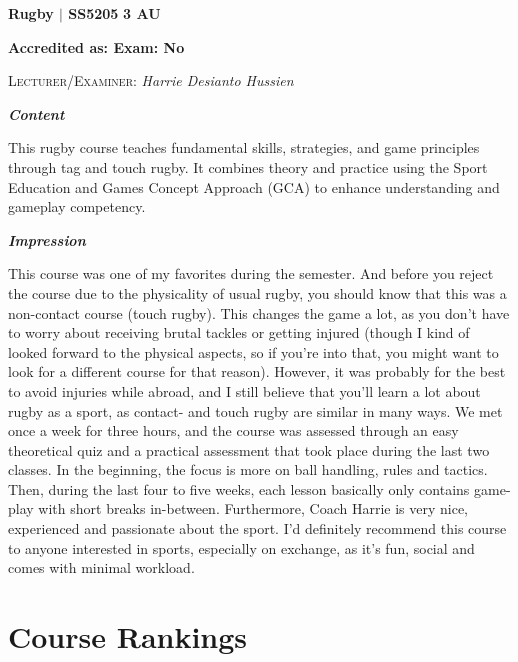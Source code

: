 \hrulefill

{\large{\textbf{Rugby $\vert$ SS5205} \hfill \textbf{3 AU}}}
\vspace{-0.3cm}

\textbf{Accredited as: \hfill Exam: No}

{\large{\textsc{Lecturer/Examiner:} \textit{Harrie Desianto Hussien}}} \vspace{0.4cm}

{\large{\textbf{\textit{Content}}}} 
\vspace{-0.25cm}

This rugby course teaches fundamental skills, strategies, and game principles through tag and touch rugby. It combines theory and practice using the Sport Education and Games Concept Approach (GCA) to enhance understanding and gameplay competency.

{\large{\textbf{\textit{Impression}}}}
\vspace{-0.25cm}

This course was one of my favorites during the semester. And before you reject the course due to the physicality of usual rugby, you should know that this was a non-contact course (touch rugby). This changes the game a lot, as you don't have to worry about receiving brutal tackles or getting injured (though I kind of looked forward to the physical aspects, so if you're into that, you might want to look for a different course for that reason). However, it was probably for the best to avoid injuries while abroad, and I still believe that you'll learn a lot about rugby as a sport, as contact- and touch rugby are similar in many ways. We met once a week for three hours, and the course was assessed through an easy theoretical quiz and a practical assessment that took place during the last two classes. In the beginning, the focus is more on ball handling, rules and tactics. Then, during the last four to five weeks, each lesson basically only contains game-play with short breaks in-between. Furthermore, Coach Harrie is very nice, experienced and passionate about the sport. I'd definitely recommend this course to anyone interested in sports, especially on exchange, as it's fun, social and comes with minimal workload.
\newpage

\section*{Course Rankings}
{}

